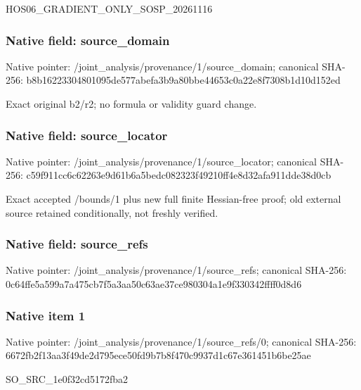 \documentclass[10pt,a4paper]{article}
\begin{document}
\begingroup\raggedright\sloppy HOS06\_\allowbreak{}GRADIENT\_\allowbreak{}ONLY\_\allowbreak{}SOSP\_\allowbreak{}20261116\par\endgroup

\subsubsection{Native field: source\_\allowbreak{}domain}
Native pointer: /joint\_\allowbreak{}analysis/provenance/1/source\_\allowbreak{}domain; canonical SHA-256: b8b16223304801095de577abefa3b9a80bbe44653c0a22e8f7308b1d10d152ed

\begingroup\raggedright\sloppy Exact original b2/\allowbreak{}r2;\allowbreak{} no formula or validity guard change.\par\endgroup

\subsubsection{Native field: source\_\allowbreak{}locator}
Native pointer: /joint\_\allowbreak{}analysis/provenance/1/source\_\allowbreak{}locator; canonical SHA-256: c59f911cc6c62263e9d61b6a5bedc082323f49210ff4e8d32afa911dde38d0cb

\begingroup\raggedright\sloppy Exact accepted /\allowbreak{}bounds/\allowbreak{}1 plus new full finite Hessian-free proof;\allowbreak{} old external source retained conditionally,\allowbreak{} not freshly verified.\par\endgroup

\subsubsection{Native field: source\_\allowbreak{}refs}
Native pointer: /joint\_\allowbreak{}analysis/provenance/1/source\_\allowbreak{}refs; canonical SHA-256: 0c64ffe5a599a7a475cb7f5a3aa50c63ae37ce980304a1e9f330342ffff0d8d6

\subsubsection{Native item 1}
Native pointer: /joint\_\allowbreak{}analysis/provenance/1/source\_\allowbreak{}refs/0; canonical SHA-256: 6672fb2f13aa3f49de2d795ece50fd9b7b8f470c9937d1c67e361451b6be25ae

\begingroup\raggedright\sloppy SO\_\allowbreak{}SRC\_\allowbreak{}1e0f32cd5172fba2\par\endgroup
\end{document}
